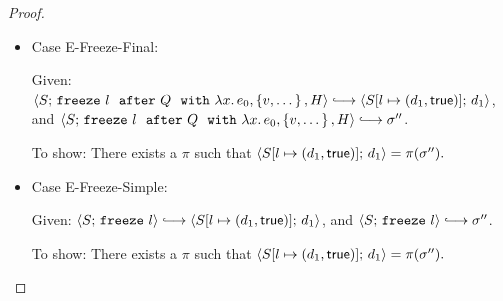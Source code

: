 \begin{proof}
\begin{itemize}

  \item Case {\sc E-Freeze-Final}:

    Given: $\config{S}{\freezeafterfull{l}{Q}{\lam{x}{e_0}}{\setof{v,
          \dots}}{H}} \parstepsto
    \config{\extS{S}{l}{d_1}{\frozentrue}}{d_1}$, and
    $\config{S}{\freezeafterfull{l}{Q}{\lam{x}{e_0}}{\setof{v,
          \dots}}{H}} \parstepsto \conf''$.

    To show: There exists a $\pi$ such that
    $\langle S[l \mapsto (d_1, \textsf{true})];\, d_1 \rangle = \pi(\sigma'').$


  \item Case {\sc E-Freeze-Simple}:

    Given: $\config{S}{\freeze{l}} \parstepsto
    \config{\extS{S}{l}{d_1}{\frozentrue}}{d_1}$, and
    $\config{S}{\freeze{l}} \parstepsto \conf''$.

    To show: There exists a $\pi$ such that
    $\langle S[l \mapsto (d_1, \textsf{true})];\, d_1 \rangle = \pi(\sigma'').$


  \end{itemize}
\end{proof}

